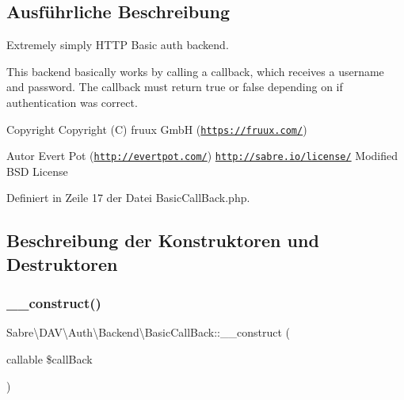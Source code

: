 \subsection{Ausführliche Beschreibung}
Extremely simply H\+T\+TP Basic auth backend.

This backend basically works by calling a callback, which receives a username and password. The callback must return true or false depending on if authentication was correct.

\begin{DoxyCopyright}{Copyright}
Copyright (C) fruux GmbH (\href{https://fruux.com/}{\tt https\+://fruux.\+com/}) 
\end{DoxyCopyright}
\begin{DoxyAuthor}{Autor}
Evert Pot (\href{http://evertpot.com/}{\tt http\+://evertpot.\+com/})  \href{http://sabre.io/license/}{\tt http\+://sabre.\+io/license/} Modified B\+SD License 
\end{DoxyAuthor}


Definiert in Zeile 17 der Datei Basic\+Call\+Back.\+php.



\subsection{Beschreibung der Konstruktoren und Destruktoren}
\mbox{\label{class_sabre_1_1_d_a_v_1_1_auth_1_1_backend_1_1_basic_call_back_ad630bf98331d3277cf33ee591b698b22}} 
\subsubsection{\texorpdfstring{\+\_\+\+\_\+construct()}{\_\_construct()}}
{\footnotesize\ttfamily Sabre\textbackslash{}\+D\+A\+V\textbackslash{}\+Auth\textbackslash{}\+Backend\textbackslash{}\+Basic\+Call\+Back\+::\+\_\+\+\_\+construct (\begin{DoxyParamCaption}\item[{callable}]{\$call\+Back }\end{DoxyParamCaption})}

